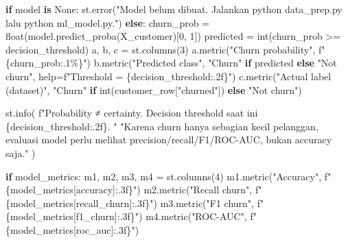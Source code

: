 \documentclass[
  indonesian,
  letterpaper,
  DIV=11,
  numbers=noendperiod]{scrreprt}
\newenvironment{Shaded}{\begin{snugshade}}{\end{snugshade}}
\newcommand{\BuiltInTok}[1]{\textcolor[rgb]{0.00,0.23,0.31}{#1}}
\newcommand{\ControlFlowTok}[1]{\textcolor[rgb]{0.00,0.23,0.31}{\textbf{#1}}}
\newcommand{\DecValTok}[1]{\textcolor[rgb]{0.68,0.00,0.00}{#1}}
\newcommand{\KeywordTok}[1]{\textcolor[rgb]{0.00,0.23,0.31}{\textbf{#1}}}
\newcommand{\NormalTok}[1]{\textcolor[rgb]{0.00,0.23,0.31}{#1}}
\newcommand{\OperatorTok}[1]{\textcolor[rgb]{0.37,0.37,0.37}{#1}}
\newcommand{\SpecialCharTok}[1]{\textcolor[rgb]{0.37,0.37,0.37}{#1}}
\newcommand{\SpecialStringTok}[1]{\textcolor[rgb]{0.13,0.47,0.30}{#1}}
\newcommand{\StringTok}[1]{\textcolor[rgb]{0.13,0.47,0.30}{#1}}
\newcommand{\VariableTok}[1]{\textcolor[rgb]{0.07,0.07,0.07}{#1}}
\begin{document}
\begin{Shaded}
\begin{Highlighting}[]
    \ControlFlowTok{if}\NormalTok{ model }\KeywordTok{is} \VariableTok{None}\NormalTok{:}
\NormalTok{        st.error(}\StringTok{"Model belum dibuat. Jalankan \textasciigrave{}python data\_prep.py\textasciigrave{} lalu \textasciigrave{}python ml\_model.py\textasciigrave{}."}\NormalTok{)}
    \ControlFlowTok{else}\NormalTok{:}
\NormalTok{        churn\_prob }\OperatorTok{=} \BuiltInTok{float}\NormalTok{(model.predict\_proba(X\_customer)[}\DecValTok{0}\NormalTok{, }\DecValTok{1}\NormalTok{])}
\NormalTok{        predicted }\OperatorTok{=} \BuiltInTok{int}\NormalTok{(churn\_prob }\OperatorTok{\textgreater{}=}\NormalTok{ decision\_threshold)}
\NormalTok{        a, b, c }\OperatorTok{=}\NormalTok{ st.columns(}\DecValTok{3}\NormalTok{)}
\NormalTok{        a.metric(}\StringTok{"Churn probability"}\NormalTok{, }\SpecialStringTok{f"}\SpecialCharTok{\{}\NormalTok{churn\_prob}\SpecialCharTok{:.1\%\}}\SpecialStringTok{"}\NormalTok{)}
\NormalTok{        b.metric(}\StringTok{"Predicted class"}\NormalTok{, }\StringTok{"Churn"} \ControlFlowTok{if}\NormalTok{ predicted }\ControlFlowTok{else} \StringTok{"Not churn"}\NormalTok{, }\BuiltInTok{help}\OperatorTok{=}\SpecialStringTok{f"Threshold = }\SpecialCharTok{\{}\NormalTok{decision\_threshold}\SpecialCharTok{:.2f\}}\SpecialStringTok{"}\NormalTok{)}
\NormalTok{        c.metric(}\StringTok{"Actual label (dataset)"}\NormalTok{, }\StringTok{"Churn"} \ControlFlowTok{if} \BuiltInTok{int}\NormalTok{(customer\_row[}\StringTok{"churned"}\NormalTok{]) }\ControlFlowTok{else} \StringTok{"Not churn"}\NormalTok{)}

\NormalTok{        st.info(}
            \SpecialStringTok{f"Probability ≠ certainty. Decision threshold saat ini }\SpecialCharTok{\{}\NormalTok{decision\_threshold}\SpecialCharTok{:.2f\}}\SpecialStringTok{. "}
            \StringTok{"Karena churn hanya sebagian kecil pelanggan, evaluasi model perlu melihat precision/recall/F1/ROC{-}AUC, bukan accuracy saja."}
\NormalTok{        )}

        \ControlFlowTok{if}\NormalTok{ model\_metrics:}
\NormalTok{            m1, m2, m3, m4 }\OperatorTok{=}\NormalTok{ st.columns(}\DecValTok{4}\NormalTok{)}
\NormalTok{            m1.metric(}\StringTok{"Accuracy"}\NormalTok{, }\SpecialStringTok{f"}\SpecialCharTok{\{}\NormalTok{model\_metrics[}\StringTok{\textquotesingle{}accuracy\textquotesingle{}}\NormalTok{]}\SpecialCharTok{:.3f\}}\SpecialStringTok{"}\NormalTok{)}
\NormalTok{            m2.metric(}\StringTok{"Recall churn"}\NormalTok{, }\SpecialStringTok{f"}\SpecialCharTok{\{}\NormalTok{model\_metrics[}\StringTok{\textquotesingle{}recall\_churn\textquotesingle{}}\NormalTok{]}\SpecialCharTok{:.3f\}}\SpecialStringTok{"}\NormalTok{)}
\NormalTok{            m3.metric(}\StringTok{"F1 churn"}\NormalTok{, }\SpecialStringTok{f"}\SpecialCharTok{\{}\NormalTok{model\_metrics[}\StringTok{\textquotesingle{}f1\_churn\textquotesingle{}}\NormalTok{]}\SpecialCharTok{:.3f\}}\SpecialStringTok{"}\NormalTok{)}
\NormalTok{            m4.metric(}\StringTok{"ROC{-}AUC"}\NormalTok{, }\SpecialStringTok{f"}\SpecialCharTok{\{}\NormalTok{model\_metrics[}\StringTok{\textquotesingle{}roc\_auc\textquotesingle{}}\NormalTok{]}\SpecialCharTok{:.3f\}}\SpecialStringTok{"}\NormalTok{)}


\end{Highlighting}
\end{Shaded}
\end{document}
